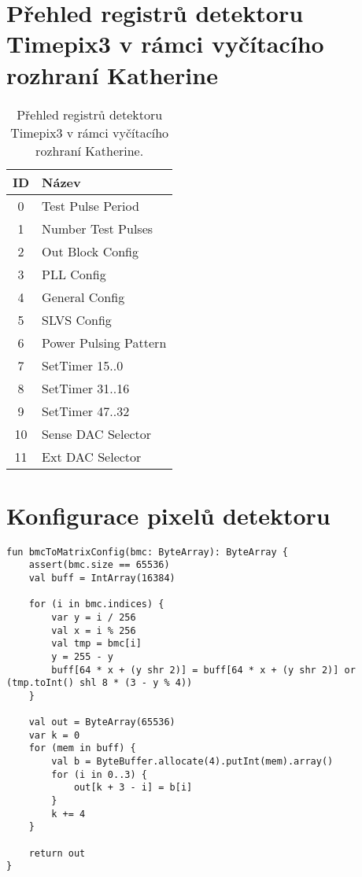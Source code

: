 \section{Přehled registrů detektoru Timepix3 v rámci vyčítacího rozhraní Katherine}\label{chap:app:katherine:tpx3_registers}
\begin{table}[h!]
	\begin{center}
		\begin{tabular}{|c|l|}
			\hline
            \textbf{ID} & \textbf{Název} \\
			\hline
            0 & Test Pulse Period \\
            1 & Number Test Pulses \\
            2 & Out Block Config \\
            3 & PLL Config \\
            4 & General Config \\
            5 & SLVS Config \\
            6 & Power Pulsing Pattern \\
            7 & SetTimer 15..0 \\
            8 & SetTimer 31..16 \\
            9 & SetTimer 47..32 \\
            10 & Sense DAC Selector \\
            11 & Ext DAC Selector \\
			\hline
		\end{tabular}
	\end{center}
	\caption{Přehled registrů detektoru Timepix3 v rámci vyčítacího rozhraní Katherine.}
\end{table}

\section{Konfigurace pixelů detektoru}\label{chap:app:katherine:pix_config}
\begin{code}[h!]
\begin{verbatim}
fun bmcToMatrixConfig(bmc: ByteArray): ByteArray {
    assert(bmc.size == 65536)
    val buff = IntArray(16384)

    for (i in bmc.indices) {
        var y = i / 256
        val x = i % 256
        val tmp = bmc[i]
        y = 255 - y
        buff[64 * x + (y shr 2)] = buff[64 * x + (y shr 2)] or (tmp.toInt() shl 8 * (3 - y % 4))
    }

    val out = ByteArray(65536)
    var k = 0
    for (mem in buff) {
        val b = ByteBuffer.allocate(4).putInt(mem).array()
        for (i in 0..3) {
            out[k + 3 - i] = b[i]
        }
        k += 4
    }

    return out
}
\end{verbatim}
\caption{Ukázka kódu pro převod pixelové konfigurace detektoru z formátu \texttt{BMC} do formátu podporovaného vyčítacím rozhraním \textit{Katherine}.}
\end{code}